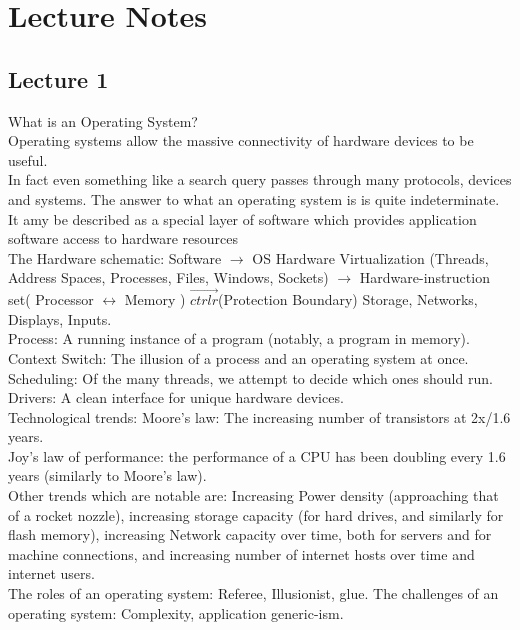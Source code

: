 \documentclass[paper=a4, fontsize=11pt]{scrartcl} %
\numberwithin{equation}{section} %
\numberwithin{figure}{section} %
\numberwithin{table}{section} %
\begin{document}
\section{Lecture Notes}
\subsection{Lecture 1}
What is an Operating System? \\
Operating systems allow the massive connectivity of hardware devices to be useful. \\
In fact even something like a search query passes through many protocols, devices and systems.
The answer to what an operating system is is quite indeterminate. It amy be described as a special layer of software which provides application software access to hardware resources\\
The Hardware schematic: Software $\rightarrow$ OS Hardware Virtualization (Threads, Address Spaces, Processes, Files, Windows, Sockets) $\rightarrow$ Hardware-instruction set( Processor $\leftrightarrow$ Memory ) $\overrightarrow{ctrlr}$(Protection Boundary) Storage, Networks, Displays, Inputs. \\
Process: A running instance of a program (notably, a program in memory). \\
Context Switch: The illusion of a process and an operating system at once. \\
Scheduling: Of the many threads, we attempt to decide which ones should run.\\
Drivers: A clean interface for unique hardware devices. \\
Technological trends: Moore's law: The increasing number of transistors at 2x/1.6 years.\\
Joy's law of performance: the performance of a CPU has been doubling every 1.6 years (similarly to Moore's law). \\
Other trends which are notable are: Increasing Power density (approaching that of a rocket nozzle), increasing storage capacity (for hard drives, and similarly for flash memory), increasing Network capacity over time, both for servers and for machine connections, and increasing number of internet hosts over time and internet users.\\
The roles of an operating system: Referee, Illusionist, glue. The challenges of an operating system: Complexity, application generic-ism.
\end{document}
